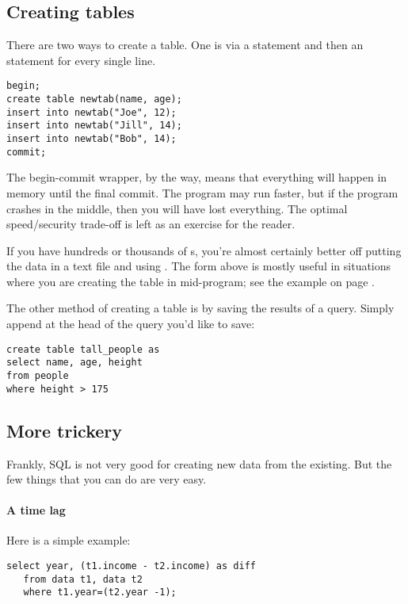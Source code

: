 \subsection{Creating tables} There are two ways to create a table. One
is via  a  statement and then an  statement
for every single line. 
\begin{lstlisting}
begin;
create table newtab(name, age);
insert into newtab("Joe", 12);
insert into newtab("Jill", 14);
insert into newtab("Bob", 14);
commit;
\end{lstlisting}
The begin-commit wrapper, by the way, means that everything will happen
in memory until the final commit. The program may run faster, but if
the program crashes in the middle, then you will have lost everything.
The optimal speed/security trade-off is left as an exercise for the
reader.

If you have hundreds or thousands of s, you're almost certainly better off putting the data
in a text file and using . The form
above is mostly useful in situations where you are creating the table in mid-program; see the example on page \pageref{createeg}.


The other method of creating a table is by saving the results of a
query. Simply append  at the head of the
query you'd like to save: 
\begin{lstlisting}
create table tall_people as
select name, age, height 
from people
where height > 175
\end{lstlisting}



\subsection{More trickery} Frankly, SQL is not very good for
creating new data from the existing. But the few things that you can do
are very easy.

\paragraph{A time lag} Here is a simple example:
\begin{lstlisting}
select year, (t1.income - t2.income) as diff
   from data t1, data t2
   where t1.year=(t2.year -1);
\end{lstlisting}

